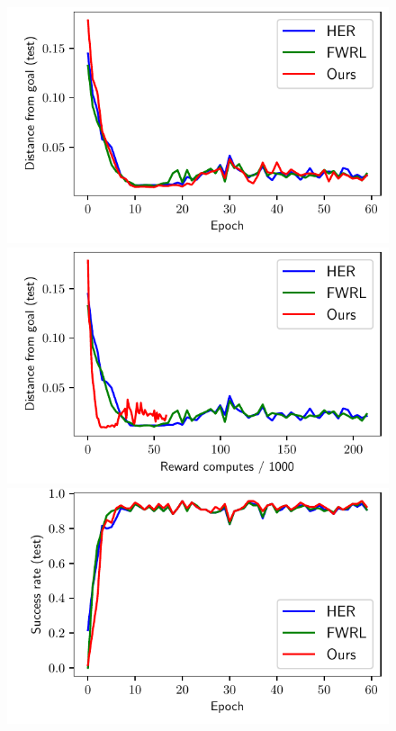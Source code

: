 %
\begin{figure}%
  \def\frac{0.24}
  \includegraphics[width=\frac\columnwidth]{media/res/6efc1de-path_reward_low_thresh_chosen-FetchReachPR-v1-dqst/epoch-test/ag_g_dist.pdf}%
  \includegraphics[width=\frac\columnwidth]{media/res/6efc1de-path_reward_low_thresh_chosen-FetchReachPR-v1-dqst/reward_computes-test/ag_g_dist.pdf}%
  \includegraphics[width=\frac\columnwidth]{media/res/6efc1de-path_reward_low_thresh_chosen-FetchReachPR-v1-dqst/epoch-test/success_rate.pdf}%

\end{figure}
